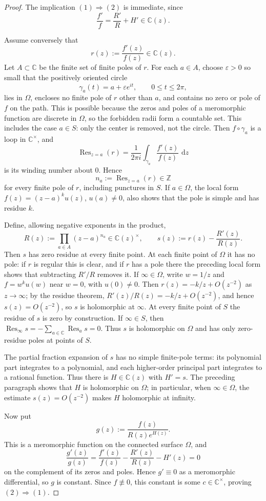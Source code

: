 \documentclass[reqno]{article}
\theoremstyle{definition}
\theoremstyle{remark}
\theoremstyle{plain}
\newcommand{\dd}{\,\mathrm d}
\begin{document}
\begin{proof}
The implication $(1)\Rightarrow(2)$ is immediate, since
\[\frac{f'}{f}=\frac{R'}{R}+H'\in\mathbb C(z).\]

Assume conversely that
\[r(z):=\frac{f'(z)}{f(z)}\in \mathbb C(z).\]
Let $A\subset\mathbb C$ be the finite set of finite poles of $r$. For each $a\in A$, choose $\varepsilon>0$ so small that the positively oriented circle
\[\gamma_a(t)=a+\varepsilon e^{it}, \qquad 0\le t\le 2\pi,\]
lies in $\Omega$, encloses no finite pole of $r$ other than $a$, and contains no zero or pole of $f$ on the path. This is possible because the zeros and poles of a meromorphic function are discrete in $\Omega$, so the forbidden radii form a countable set. This includes the case $a\in S$: only the center is removed, not the circle. Then $f\circ\gamma_a$ is a loop in $\mathbb C^\times$, and
\[\operatorname{Res}_{z=a}(r)=\frac{1}{2\pi i}\int_{\gamma_a}\frac{f'(z)}{f(z)}\,\dd z\]
is its winding number about $0$. Hence
\[n_a:=\operatorname{Res}_{z=a}(r)\in\mathbb Z\]
for every finite pole of $r$, including punctures in $S$. If $a\in\Omega$, the local form $f(z)=(z-a)^k u(z)$, $u(a)\ne0$, also shows that the pole is simple and has residue $k$.

Define, allowing negative exponents in the product,
\[R(z):=\prod_{a\in A}(z-a)^{n_a}\in\mathbb C(z)^\times,\qquad
s(z):=r(z)-\frac{R'(z)}{R(z)}.\]
Then $s$ has zero residue at every finite point. At each finite point of $\Omega$ it has no pole: if $r$ is regular this is clear, and if $r$ has a pole there the preceding local form shows that subtracting $R'/R$ removes it. If $\infty\in\Omega$, write $w=1/z$ and $f=w^k u(w)$ near $w=0$, with $u(0)\ne0$. Then $r(z)=-k/z+O(z^{-2})$ as $z\to\infty$; by the residue theorem, $R'(z)/R(z)=-k/z+O(z^{-2})$, and hence $s(z)=O(z^{-2})$, so $s$ is holomorphic at $\infty$. At every finite point of $S$ the residue of $s$ is zero by construction. If $\infty\in S$, then $\operatorname{Res}_\infty s=-\sum_{a\in\mathbb C}\operatorname{Res}_a s=0$. Thus $s$ is holomorphic on $\Omega$ and has only zero-residue poles at points of $S$.

The partial fraction expansion of $s$ has no simple finite-pole terms: its polynomial part integrates to a polynomial, and each higher-order principal part integrates to a rational function. Thus there is $H\in\mathbb C(z)$ with $H'=s$. The preceding paragraph shows that $H$ is holomorphic on $\Omega$; in particular, when $\infty\in\Omega$, the estimate $s(z)=O(z^{-2})$ makes $H$ holomorphic at infinity.

Now put
\[g(z):=\frac{f(z)}{R(z)e^{H(z)}}.\]
This is a meromorphic function on the connected surface $\Omega$, and
\[\frac{g'(z)}{g(z)}=\frac{f'(z)}{f(z)}-\frac{R'(z)}{R(z)}-H'(z)=0\]
on the complement of its zeros and poles. Hence $g'\equiv0$ as a meromorphic differential, so $g$ is constant. Since $f\not\equiv0$, this constant is some $c\in\mathbb C^\times$, proving $(2)\Rightarrow(1)$.
\end{proof}
\end{document}
